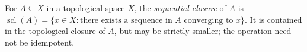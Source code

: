 
For $A\subseteq X$ in a topological space $X$, the \emph{sequential closure} of $A$ is $\operatorname{scl}(A)=\{x\in X:\text{there exists a sequence in }A\text{ converging to }x\}$. It is contained in the topological closure of $A$, but may be strictly smaller; the operation need not be idempotent.
